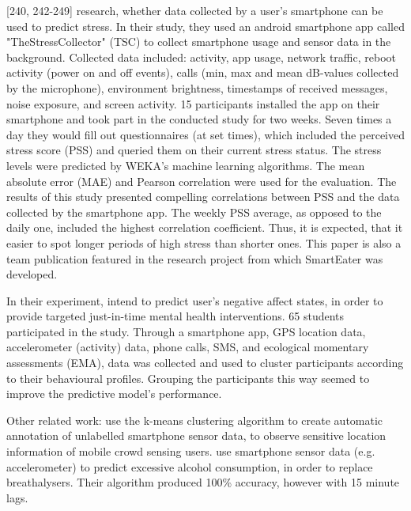 \textcite{SmartphoneBasedStressPrediction2015}[240, 242-249] research, whether data collected by a user's smartphone can be used to predict stress. In their study, they used an android smartphone app called "TheStressCollector" (TSC) to collect smartphone usage and sensor data in the background. Collected data included: activity, app usage, network traffic, reboot activity (power on and off events), calls (min, max and mean dB-values collected by the microphone), environment brightness, timestamps of received messages, noise exposure, and screen activity. 15 participants installed the app on their smartphone and took part in the conducted study for two weeks. Seven times a day they would fill out questionnaires (at set times), which included the perceived stress score (PSS) and queried them on their current stress status. The stress levels were predicted by WEKA's machine learning algorithms. The mean absolute error (MAE) and Pearson correlation were used for the evaluation. The results of this study presented compelling correlations between PSS and the data collected by the smartphone app. The weekly PSS average, as opposed to the daily one, included the highest correlation coefficient. Thus, it is expected, that it easier to spot longer periods of high stress than shorter ones. This paper is also a team publication featured in the research project from which SmartEater was developed.

In their experiment, \textcite{ClusterPassivelySensedData2018} intend to predict user's negative affect states, in order to provide targeted just-in-time mental health interventions. 65 students participated in the study. Through a smartphone app, GPS location data, accelerometer (activity) data, phone calls, SMS, and ecological momentary assessments (EMA), data was collected and used to cluster participants according to their behavioural profiles. Grouping the participants this way seemed to improve the predictive model's performance.


Other related work: 
\textcite{pius2018automatic} use the k-means clustering algorithm to create automatic annotation of unlabelled smartphone sensor data, to observe sensitive location information of mobile crowd sensing users. \textcite{alcoholCravingPrediction} use smartphone sensor data (e.g. accelerometer) to predict excessive alcohol consumption, in order to replace breathalysers. Their algorithm produced 100\% accuracy, however with 15 minute lags.







